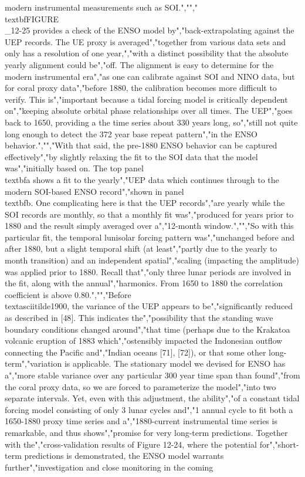 {{{{{{{{{{modern instrumental measurements such as SOI.","","\\textbf{FIGURE\\_12-25} provides a check of the ENSO model by","back-extrapolating against the UEP records. The UE proxy is averaged","together from various data sets and only has a resolution of one year,","with a distinct possibility that the absolute yearly alignment could be","off. The alignment is easy to determine for the modern instrumental era","as one can calibrate against SOI and NINO data, but for coral proxy data","before 1880, the calibration becomes more difficult to verify. This is","important because a tidal forcing model is critically dependent on","keeping absolute orbital phase relationships over all times. The UEP","goes back to 1650, providing a the time series about 330 years long, so","still not quite long enough to detect the 372 year base repeat pattern","in the ENSO behavior.","","With that said, the pre-1880 ENSO behavior can be captured effectively","by slightly relaxing the fit to the SOI data that the model was","initially based on. The top panel \\textbf{a} shows a fit to the yearly","UEP data which continues through to the modern SOI-based ENSO record","shown in panel \\textbf{b}. One complicating here is that the UEP records","are yearly while the SOI records are monthly, so that a monthly fit was","produced for years prior to 1880 and the result simply averaged over a","12-month window.","","So with this particular fit, the temporal lunisolar forcing pattern was","unchanged before and after 1880, but a slight temporal shift (at least","partly due to the yearly to month transition) and an independent spatial","scaling (impacting the amplitude) was applied prior to 1880. Recall that","only three lunar periods are involved in the fit, along with the annual","harmonics. From 1650 to 1880 the correlation coefficient is above 0.80.","","Before \\textasciitilde1900, the variance of the UEP appears to be","significantly reduced as described in {[}48{]}. This indicates the","possibility that the standing wave boundary conditions changed around","that time (perhaps due to the Krakatoa volcanic eruption of 1883 which","ostensibly impacted the Indonesian outflow connecting the Pacific and","Indian oceans {[}71{]}, {[}72{]}), or that some other long-term","variation is applicable. The stationary model we devised for ENSO has a","more stable variance over any particular 300 year time span than found","from the coral proxy data, so we are forced to parameterize the model","into two separate intervals. Yet, even with this adjustment, the ability","of a constant tidal forcing model consisting of only 3 lunar cycles and","1 annual cycle to fit both a 1650-1880 proxy time series and a","1880-current instrumental time series is remarkable, and thus shows","promise for very long-term predictions. Together with the","cross-validation results of Figure 12-24, where the potential for","short-term predictions is demonstrated, the ENSO model warrants further","investigation and close monitoring in the coming }}}}}}}}}}
